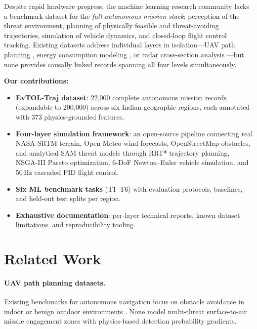 ﻿\documentclass{article}
\begin{document}
Despite rapid hardware progress, the machine learning research community
lacks a benchmark dataset for the \emph{full autonomous mission stack}:
perception of the threat environment, planning of physically feasible and
threat-avoiding trajectories, simulation of vehicle dynamics, and closed-loop
flight control tracking.
Existing datasets address individual layers in isolation---UAV path planning
\citep{ong2021uav}, energy consumption modeling \citep{rodrigues2021energy},
or radar cross-section analysis \citep{skolnik2008radar}---but none provides
causally linked records spanning all four levels simultaneously.

\textbf{Our contributions:}
\begin{itemize}
  \item \textbf{EvTOL-Traj dataset}: 22{,}000 complete autonomous mission
    records (expandable to 200{,}000) across six Indian geographic regions,
    each annotated with 373 physics-grounded features.
  \item \textbf{Four-layer simulation framework}: an open-source pipeline
    connecting real NASA SRTM terrain, Open-Meteo wind forecasts, OpenStreetMap
    obstacles, and analytical SAM threat models through RRT*
    \citep{karaman2011sampling} trajectory planning, NSGA-III
    \citep{deb2014evolutionary} Pareto optimization, 6-DoF Newton--Euler
    vehicle simulation, and 50\,Hz cascaded PID flight control.
  \item \textbf{Six ML benchmark tasks} (T1--T6) with evaluation protocols,
    baselines, and held-out test splits per region.
  \item \textbf{Exhaustive documentation}: per-layer technical reports,
    known dataset limitations, and reproducibility tooling.
\end{itemize}

\section{Related Work}
\label{sec:related}

\paragraph{UAV path planning datasets.}
Existing benchmarks for autonomous navigation focus on obstacle avoidance
in indoor or benign outdoor environments \citep{ong2021uav,sun2022motion}.
None model multi-threat surface-to-air missile engagement zones with
physics-based detection probability gradients.
\end{document}
